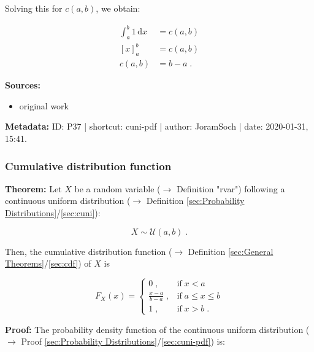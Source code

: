 \documentclass[a4paper,12pt]{book}
\begin{document}
Solving this for $c(a,b)$, we obtain:

\begin{equation} \label{eq:cuni-pdf-cuni-pdf-s4}
\begin{split}
\int_{a}^{b} 1 \, \mathrm{d}x &= c(a,b) \\
[x]_a^b &= c(a,b) \\
c(a,b) &= b-a \; .
\end{split}
\end{equation}

\vspace{1em}
\textbf{Sources:}
\begin{itemize}
\item original work\end{itemize}


\vspace{1em}
\textbf{Metadata:} ID: P37 | shortcut: cuni-pdf | author: JoramSoch | date: 2020-01-31, 15:41.


\subsubsection[\textbf{Cumulative distribution function}]{Cumulative distribution function} \label{sec:cuni-cdf}

\vspace{1em}
\textbf{Theorem:} Let $X$ be a random variable ($\rightarrow$ Definition "rvar") following a continuous uniform distribution ($\rightarrow$ Definition \ref{sec:Probability Distributions}/\ref{sec:cuni}):

\begin{equation} \label{eq:cuni-cdf-cuni}
X \sim \mathcal{U}(a, b) \; .
\end{equation}

Then, the cumulative distribution function ($\rightarrow$ Definition \ref{sec:General Theorems}/\ref{sec:cdf}) of $X$ is

\begin{equation} \label{eq:cuni-cdf-cuni-cdf}
F_X(x) = \left\{
\begin{array}{rl}
0 \; , & \text{if} \; x < a \\
\frac{x-a}{b-a} \; , & \text{if} \; a \leq x \leq b \\
1 \; , & \text{if} \; x > b \; .
\end{array}
\right.
\end{equation}


\vspace{1em}
\textbf{Proof:} The probability density function of the continuous uniform distribution ($\rightarrow$ Proof \ref{sec:Probability Distributions}/\ref{sec:cuni-pdf}) is:
\end{document}
